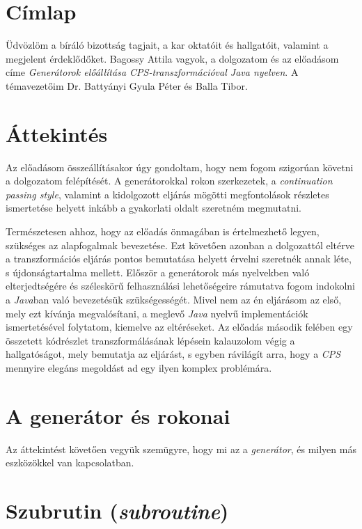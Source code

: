 \documentclass[12pt, a4paper]{article}
\begin{document}
\setcounter{section}{-1}
\section{Címlap}
Üdvözlöm a bíráló bizottság tagjait, a kar oktatóit és hallgatóit, valamint a megjelent érdeklődőket. Bagossy Attila vagyok, a dolgozatom és az előadásom címe \textit{Generátorok előállítása CPS-transzformációval Java nyelven}. A témavezetőim Dr. Battyányi Gyula Péter és Balla Tibor.

\section{Áttekintés}
Az előadásom összeállításakor úgy gondoltam, hogy nem fogom szigorúan követni a dolgozatom felépítését. A generátorokkal rokon szerkezetek, a \textit{continuation passing style}, valamint a kidolgozott eljárás mögötti megfontolások részletes ismertetése helyett inkább a gyakorlati oldalt szeretném megmutatni. 

Természetesen ahhoz, hogy az előadás önmagában is értelmezhető legyen, szükséges az alapfogalmak bevezetése. Ezt követően azonban a dolgozattól eltérve a transzformációs eljárás pontos bemutatása helyett érvelni szeretnék annak léte, s újdonságtartalma mellett. Először a generátorok más nyelvekben való elterjedtségére és széleskörű felhasználási lehetőségeire rámutatva fogom indokolni a \textit{Java}ban való bevezetésük szükségességét. Mivel nem az én eljárásom az első, mely ezt kívánja megvalósítani, a meglevő \textit{Java} nyelvű implementációk ismertetésével folytatom, kiemelve az eltéréseket. Az előadás második felében egy összetett kódrészlet transzformálásának lépésein kalauzolom végig a hallgatóságot, mely bemutatja az eljárást, s egyben rávilágít arra, hogy a \textit{CPS} mennyire elegáns megoldást ad egy ilyen komplex problémára.

\section{A generátor és rokonai}

Az áttekintést követően vegyük szemügyre, hogy mi az a \textit{generátor}, és milyen más eszközökkel van kapcsolatban.

\section{Szubrutin (\textit{subroutine})}
\end{document}
